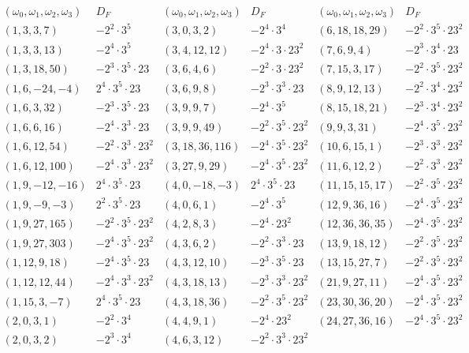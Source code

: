 \begin{landscape}
$$\begin{array}{cc|cc|cc}
\end{array}
$$
$$
\begin{array}{cc|cc|cc} 
(\omega_0,\omega_1,\omega_2,\omega_3) & D_F & (\omega_0,\omega_1,\omega_2,\omega_3)  & D_F & (\omega_0,\omega_1,\omega_2,\omega_3)  & D_F \\ \hline
(1,3,3,7) & -2^2 \cdot 3^5 & (3, 0, 3, 2) & -2^4 \cdot 3^4 & (6, 18, 18, 29) & -2^2 \cdot 3^5 \cdot 23^2 \\
(1,3,3,13) & -2^4 \cdot 3^5 & (3, 4, 12, 12) & -2^4 \cdot 3 \cdot 23^2 & (7, 6, 9, 4) & -2^3 \cdot 3^4 \cdot 23 \\
(1, 3, 18, 50) & -2^3 \cdot 3^5 \cdot 23 & (3, 6, 4, 6) & -2^2 \cdot 3 \cdot 23^2  & (7, 15, 3, 17) & -2^2 \cdot 3^5 \cdot 23^2 \\
( 1, 6, -24, -4) & 2^4 \cdot 3^5 \cdot 23 & (3, 6, 9, 8) & -2^3 \cdot 3^3 \cdot 23 & (8, 9, 12, 13) & -2^2 \cdot 3^4 \cdot 23^2 \\
(1, 6, 3, 32) & -2^3 \cdot 3^5 \cdot 23 & (3, 9, 9, 7) & -2^4 \cdot 3^5 & (8, 15, 18, 21) & -2^3 \cdot 3^4 \cdot 23^2 \\
(1, 6, 6, 16) & -2^4 \cdot 3^3 \cdot 23 & (3, 9, 9, 49) & -2^2 \cdot 3^5 \cdot 23^2 & (9,9,3,31) & -2^4 \cdot 3^5 \cdot 23^2 \\
(1,6,12,54) & -2^2 \cdot 3^3 \cdot 23^2 & (3,18,36,116) & -2^4 \cdot 3^5 \cdot 23^2 & (10, 6, 15, 1) & -2^3 \cdot 3^3 \cdot 23^2 \\
(1,6,12,100) & -2^4 \cdot 3^3 \cdot 23^2 & (3,27,9,29) & -2^4 \cdot 3^5 \cdot 23^2 & (11, 6, 12, 2) & -2^2 \cdot 3^3 \cdot 23^2 \\
( 1, 9, -12, -16) & 2^4 \cdot 3^5 \cdot 23 & ( 4, 0, -18, -3) & 2^4 \cdot 3^5 \cdot 23 & (11, 15, 15, 17) & -2^2 \cdot 3^5 \cdot 23^2 \\
(1,9,-9,-3) & 2^2 \cdot 3^5 \cdot 23 & (4, 0, 6, 1) & -2^4 \cdot 3^5  & (12,9,36,16) & -2^4 \cdot 3^5 \cdot 23^2 \\
(1,9,27,165) & -2^2 \cdot 3^5 \cdot 23^2 & (4, 2, 8, 3) & -2^4  \cdot 23^2 & (12,36,36,35) & -2^4 \cdot 3^5 \cdot 23^2 \\
(1,9,27,303) & -2^4 \cdot 3^5 \cdot 23^2 & (4, 3, 6, 2) & -2^2 \cdot 3^3 \cdot 23 & (13, 9, 18, 12) & -2^2 \cdot 3^5 \cdot 23^2 \\
(1, 12, 9, 18) & -2^4 \cdot 3^5 \cdot 23 & (4, 3, 12, 10) & -2^3 \cdot 3^5 \cdot 23 & (13, 15, 27, 7) & -2^2 \cdot 3^5 \cdot 23^2 \\
(1,12,12,44) & -2^4 \cdot 3^3 \cdot 23^2 & (4, 3, 18, 13) & -2^3 \cdot 3^3 \cdot 23^2  & (21,9,27,11) & -2^4 \cdot 3^5 \cdot 23^2 \\
( 1, 15, 3, -7) & 2^4 \cdot 3^5 \cdot 23 & (4, 3, 18, 36) & -2^2 \cdot 3^5 \cdot 23^2 & (23,30,36,20) & -2^4 \cdot 3^5 \cdot 23^2  \\
(2, 0, 3, 1) & -2^2 \cdot 3^4 & (4, 4, 9, 1) & -2^4 \cdot 23^2 & (24,27,36,16) & -2^4 \cdot 3^5 \cdot 23^2 \\
(2, 0, 3, 2) & -2^3 \cdot 3^4 & (4, 6, 3, 12) & -2^2 \cdot 3^3 \cdot 23^2 & & \\
\end{array}
$$
\end{landscape}

